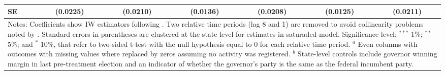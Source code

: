 \begin{landscape}
\begin{table}[htbp]
{\begin{tabular}{lcccccc}
SE       & (0.0225)  & (0.0210) & (0.0136)  & (0.0208)  & (0.0125)  & (0.0211)   \\
\hline \hline
\multicolumn{7}{p{1.2\textwidth}}{\footnotesize{Notes: Coefficients show IW estimators following \citet{abraham_sun_2020}. Two relative time periods (lag 8 and 1) are removed to avoid collinearity problems noted by \citet{abraham_sun_2020}. Standard errors in parentheses are clustered at the state level for estimates in saturaded model. Significance-level: $^{***}$ 1\%; $^{**}$ 5\%; and $^*$ 10\%, that refer to two-sided t-test with the null hypothesis equal to 0 for each relative time period. $^a$ Even columns with outcomes with missing values where replaced by zeros assuming no activity was registered. $^b$ State-level controls include governor winning margin in last pre-treatment election and an indicator of whether the governor's party is the same as the federal incumbent party.}} \\
\end{tabular}
}
\end{table}
\end{landscape}
